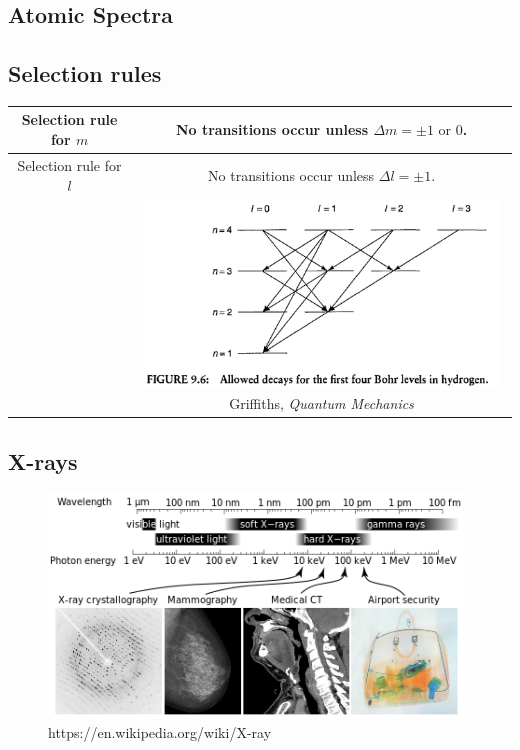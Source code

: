 

\subsection{Atomic Spectra} 

\subsection{Selection rules}
\center
\begin{tabular}{|c|c|}
\hline

Selection rule for $m$ & No transitions occur unless $\Delta m = \pm1 \textrm{ or } 0$.

\\ \hline

Selection rule for $l$ & No transitions occur unless $\Delta l = \pm1$.
\\
&
\begin{minipage}{.6\textwidth}
      \includegraphics[width=\linewidth, height=50mm]{images/SelectionRuleL.png}
      \tiny Griffiths, \textit{Quantum Mechanics}
    \end{minipage}

\\ \hline
\end{tabular}
\flushleft


\subsection{X-rays} 
\center

\begin{figure}[htbp]
    \begin{center}
	\includegraphics[width=110mm]{images/Xrays.png}
    \end{center}
    \linespread{1} 
	\caption[X-rays]{
	\tiny https://en.wikipedia.org/wiki/X-ray
	}
\label{xrays}
\end{figure}


